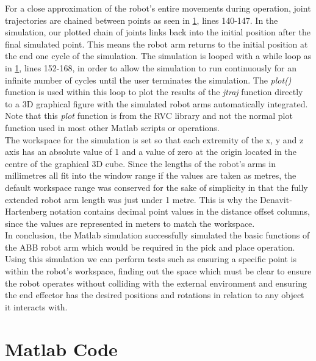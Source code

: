 \documentclass[11pt,a4paper, margin=1in]{report}
\begin{document}
For a close approximation of the robot's entire movements during operation, joint trajectories are chained between points as seen in \cref{Matlab}, lines 140-147. In the simulation, our plotted chain of joints links back into the initial position after the final simulated point. This means the robot arm returns to the initial position at the end one cycle of the simulation. The simulation is looped with a while loop as in \cref{Matlab}, lines 152-168, in order to allow the simulation to run continuously for an infinite number of cycles until the user terminates the simulation. The \textit{plot()} function is used within this loop to plot the results of the \textit{jtraj} function directly to a 3D graphical figure with the simulated robot arms automatically integrated. Note that this \textit{plot} function is from the RVC library and not the normal plot function used in most other Matlab scripts or operations.\\
The workspace for the simulation is set so that each extremity of the x, y and z axis has an absolute value of 1 and a value of zero at the origin located in the centre of the graphical 3D cube. Since the lengths of the robot's arms in millimetres all fit into the window range if the values are taken as metres, the default workspace range was conserved for the sake of simplicity in that the fully extended robot arm length was just under 1 metre. This is why the Denavit-Hartenberg notation contains decimal point values in the distance offset columns, since the values are represented in meters to match the workspace.\\
In conclusion, the Matlab simulation successfully simulated the basic functions of the ABB robot arm which would be required in the pick and place operation. Using this simulation we can perform tests such as ensuring a specific point is within the robot's workspace, finding out the space which must be clear to ensure the robot operates without colliding with the external environment and ensuring the end effector has the desired positions and rotations in relation to any object it interacts with.
\appendix
\chapter{Matlab Code}
\label{Matlab}
\end{document}
